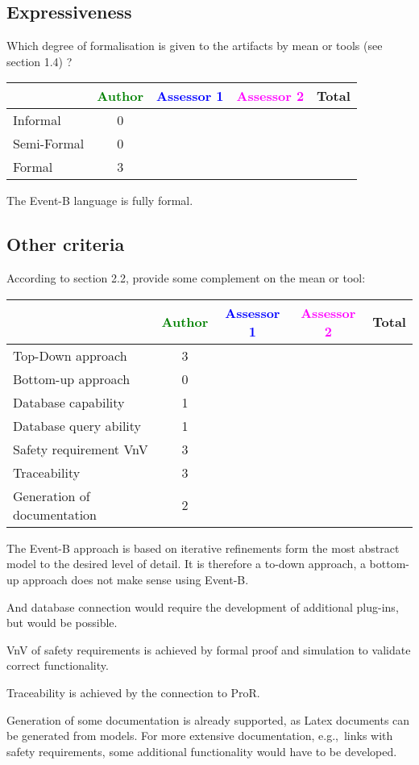 \subsection{Expressiveness}


Which degree of formalisation is given to the artifacts by mean or tools (see \citep{D4.2.a} section 1.4) ?


\begin{tabular}{|l | c | c | c | c|}
\hline
& \textcolor{green}{Author} & \textcolor{blue}{Assessor 1} & \textcolor{magenta}{Assessor 2} & Total \\
\hline
Informal & 0 & & &  \\
\hline
Semi-Formal & 0 & & & \\
\hline
Formal & 3 & & & \\
\hline
\end{tabular}

\begin{author_comment}
  The Event-B language is fully formal.
\end{author_comment}

\subsection{Other criteria}
According to \citep{D4.2.a} section 2.2, provide some complement on the mean or tool:


\begin{tabular}{|l | c | c | c | c|}
\hline
& \textcolor{green}{Author} & \textcolor{blue}{Assessor 1} & \textcolor{magenta}{Assessor 2} & Total \\
\hline
Top-Down approach  & 3 & & &  \\
\hline
Bottom-up approach & 0 & & & \\
\hline
Database capability & 1 & & & \\
\hline
Database query ability & 1 & & & \\
\hline
Safety requirement VnV & 3 & & & \\
\hline
Traceability & 3 & & & \\
\hline
Generation of documentation & 2 & & & \\
\hline
\end{tabular}

\begin{author_comment}
  The Event-B approach is based on iterative refinements form the most abstract
  model to the desired level of detail. It is therefore a to-down approach, a
  bottom-up approach does not make sense using Event-B.

  And database connection would require the development of additional plug-ins,
  but would be possible.

  VnV of safety requirements is achieved by formal proof and simulation to
  validate correct functionality.

  Traceability is achieved by the connection to ProR.

  Generation of some documentation is already supported, as Latex documents can
  be generated from models. For more extensive documentation, e.g.,\ links with
  safety requirements, some additional functionality would have to be developed.
\end{author_comment}

